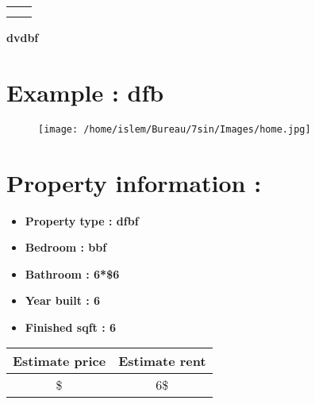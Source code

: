 \documentclass{article}%
\begin{document}
%
\normalsize%
\begin{tabu}{X[l] X[r]}%
\begin{minipage}[h]{0.49\textwidth}%
%
\end{minipage}&\begin{minipage}[t!]{0.49\textwidth}%
\flushright%
\end{minipage}\\%
&\\%
\end{tabu}%
\pagestyle{firstpage}%
\begin{minipage}{\textwidth}%
\centering%
\begin{Large}%
\textbf{\newline%
\newline%
\newline%
\newline%
\newline%
\newline%
dvdbf}%
\end{Large}%
\linebreak%
\end{minipage}%
\section{Example : dfb}%
\label{sec:Exampledfb}%


\begin{figure}[h!]%
\centering%
\texttt{[image: /home/islem/Bureau/7sin/Images/home.jpg]}%
\end{figure}

%
\section{Property information :}%
\label{sec:Propertyinformation}%
\begin{itemize}%
\item%
\textbf{Property type : dfbf}%
\item%
\textbf{Bedroom : bbf}%
\item%
\textbf{Bathroom : 6*\$6}%
\item%
\textbf{Year built : 6}%
\item%
\textbf{Finished sqft : 6}%
\linebreak%
\end{itemize}%
\begin{tabular}{|c|c|}%
\hline%
Estimate price&Estimate rent\\%
\hline%
\$&6\$\\%
\hline%
\end{tabular}
\end{document}
